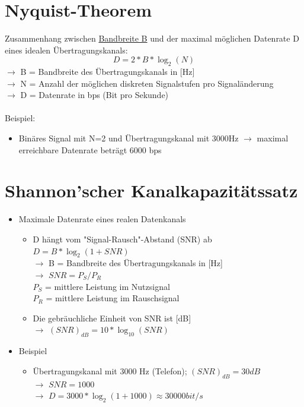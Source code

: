 \documentclass{scrreprt}
\begin{document}
\section{Nyquist-Theorem}
Zusammenhang zwischen \hyperref[sec:bandbreite]{Bandbreite B} und der maximal möglichen
Datenrate D eines idealen Übertragungskanals:
$$D = 2*B*\log_{2}(N)$$
$\rightarrow$ B = Bandbreite des Übertragungskanals in [Hz]
\\
$\rightarrow$ N = Anzahl der möglichen diskreten Signalstufen pro Signaländerung
\\
$\rightarrow$ D = Datenrate in bps (Bit pro Sekunde)
\\\\
Beispiel:
\begin{itemize}
	\item Binäres Signal mit N=2 und Übertragungskanal mit 3000Hz
	      $\rightarrow$ maximal erreichbare Datenrate beträgt 6000 bps
\end{itemize}

\section{Shannon'scher Kanalkapazitätssatz}
\begin{itemize}
	\item Maximale Datenrate eines realen Datenkanals
	      \begin{itemize}
		      \item D hängt vom "Signal-Rausch"-Abstand (SNR) ab
		            \\$D=B*\log_{2}(1+SNR)$
			            \\$\rightarrow$ B = Bandbreite des Übertragungskanals in [Hz]
		            \\$\rightarrow$ $SNR = P_{S}/P_{R}$
			            \\$P_{S}$ = mittlere Leistung im Nutzsignal
		            \\$P_{R}$ = mittlere Leistung im Rauschsignal
		      \item Die gebräuchliche Einheit von SNR ist [dB]
		            \\$\rightarrow$ $(SNR)_{dB} = 10*\log_{10}(SNR)$
	      \end{itemize}
	\item Beispiel
	      \begin{itemize}
		      \item Übertragungskanal mit 3000 Hz (Telefon); $(SNR)_{dB} = 30dB$
		            \\$\rightarrow$ $SNR = 1000$
			            \\$\rightarrow$ $D = 3000*\log_{2}(1+1000) \approx 30000bit/s$
	      \end{itemize}
\end{itemize}
\end{document}
